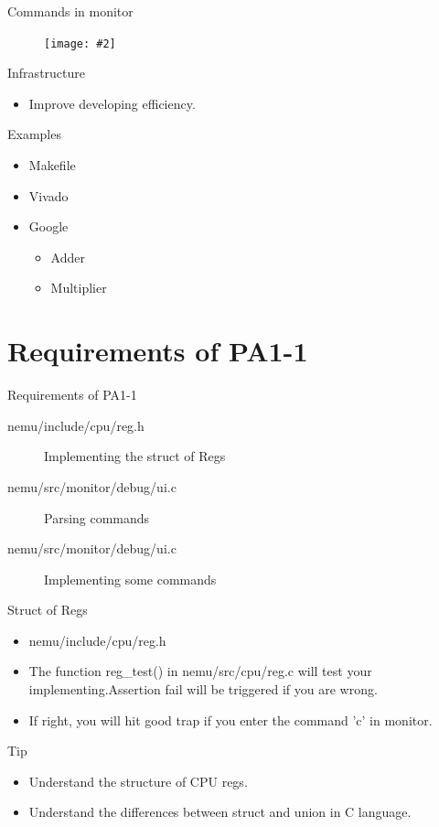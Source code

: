\documentclass{beamer}
\newcommand{\fignocaption}[2]{
	\begin{figure}[htp]
		\centering
		\texttt{[image: \#2]}
	\end{figure}
}
\begin{document}
\begin{frame}{Commands in monitor}
	\fignocaption{scale=0.3}{command.png}
\end{frame}

\begin{frame}{Infrastructure}
	\begin{itemize}
		\item Improve developing efficiency.
	\end{itemize}
	\begin{block}{Examples}
		\begin{itemize}
			\item Makefile
			\item Vivado
			\item Google
			\begin{itemize}
				\item Adder
				\item Multiplier
			\end{itemize}
		\end{itemize}
	\end{block}
\end{frame}

\section{Requirements of PA1-1}

\begin{frame}{Requirements of PA1-1}
	\begin{description}
		\item [nemu/include/cpu/reg.h]Implementing the struct of Regs
		\item [nemu/src/monitor/debug/ui.c] Parsing commands
		\item [nemu/src/monitor/debug/ui.c] Implementing some commands
	\end{description}
\end{frame}

\begin{frame}{Struct of Regs}
	\begin{itemize}
		\item nemu/include/cpu/reg.h
		\item The function reg\_test() in nemu/src/cpu/reg.c will test your implementing.Assertion fail will be triggered if you are wrong.
		\item If right, you will \alert{hit good trap} if you enter the command 'c' in monitor.
	\end{itemize}
	\begin{alertblock}{Tip}
		\begin{itemize}
			\item Understand the structure of CPU regs.
			\item Understand the differences between struct and union in C language.
		\end{itemize}
	\end{alertblock}
\end{frame}
\end{document}
